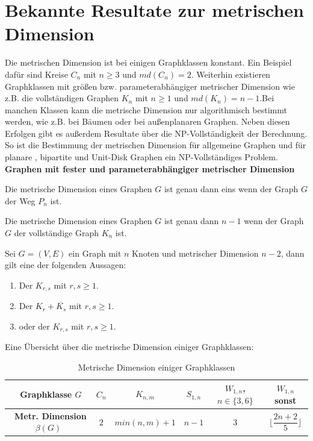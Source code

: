 \section{Bekannte Resultate zur metrischen Dimension}
Die metrischen Dimension ist bei einigen Graphklassen konstant. Ein Beispiel dafür sind Kreise $C_n$ mit $n\geq 3$ und $md(C_n)=2$. Weiterhin existieren Graphklassen mit größen bzw. parameterabhängiger metrischer Dimension wie z.B. die vollständigen Graphen $K_n$ mit $n \geq 1$ und $md(K_n)=n-1$.\newline Bei manchen Klassen kann die metrische Dimension nur algorithmisch bestimmt werden, wie z.B. bei Bäumen oder bei außenplanaren Graphen.\cite{}\newline
Neben diesen Erfolgen gibt es außerdem Resultate über die NP-Vollständigkeit der Berechnung. So ist die Bestimmung der metrischen Dimension für allgemeine Graphen \cite{} und für planare \cite{}, bipartite \cite{} und Unit-Disk Graphen \cite{} ein NP-Vollständiges Problem.\newline\newline
{\textbf{Graphen mit fester und parameterabhängiger metrischer Dimension}}
\begin{lem}
\label{path}\cite{landmarks}
Die metrische Dimension eines Graphen $G$ ist genau dann eins wenn der Graph $G$ der Weg $P_n$ ist.
\end{lem}
\begin{lem}
\label{complete}\cite{landmarks}
Die metrische Dimension eines Graphen $G$ ist genau dann $n-1$ wenn der Graph $G$ der vollständige Graph $K_n$ ist.
\end{lem}
\begin{lem}\cite{landmarks}
Sei $G = (V, E)$ ein Graph mit $n$ Knoten und metrischer Dimension $n-2$, dann gilt eine der folgenden Aussagen:
\begin{enumerate}
\item Der $K_{r,s}$ mit $r,s \geq 1$.
\item Der $K_{r}+ \overline{K_s}$ mit $r,s \geq 1$.
\item oder der $K_{r,s}$ mit $r,s \geq 1$.
\end{enumerate}
\end{lem}
Eine Übersicht über die metrische Dimension einiger Graphklassen:
  \begin{table}[htb]
     \centering
     \begin{tabularx}{\textwidth}{|c|c|c|c|c|c|}
     	\hline  
       \parbox[c][5em][c]{0pt}{~}\textbf{Graphklasse} $G$ & $C_n$&$K_{n,m}$&$S_{1,n}$&$W_{1,n}$, $n \in \{3,6\}$&$W_{1,n}$ sonst \\[2em]
		\hline       
       \parbox[c][5em][c]{0pt}{~}\textbf{Metr. Dimension $\beta(G)$}& $2$&$min(n,m)+1$& $n-1$  &$3$  &$\lfloor \dfrac{2n+2}{5} \rfloor$        \\[2em]
       	\hline  
     \end{tabularx}
 
     \caption{Metrische Dimension einiger Graphklassen}
     \label{tbl:Metrische Dimension einiger Graphklassen}
   \end{table}
